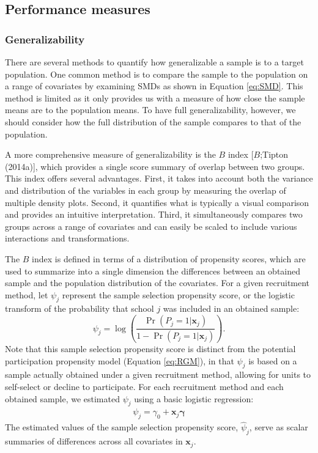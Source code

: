 \documentclass[
  english,
  man,floatsintext]{apa6}
\begin{document}
\hypertarget{performance-measures}{%
\subsection{Performance measures}\label{performance-measures}}

\hypertarget{generalizability}{%
\subsubsection{Generalizability}\label{generalizability}}

There are several methods to quantify how generalizable a sample is to a target population. One common method is to compare the sample to the population on a range of covariates by examining SMDs as shown in Equation \eqref{eq:SMD}. This method is limited as it only provides us with a measure of how close the sample means are to the population means.
To have full generalizability, however, we should consider how the full distribution of the sample compares to that of the population.

A more comprehensive measure of generalizability is the \(B\) index {[}\(B\);Tipton (2014a){]}, which provides a single score summary of overlap between two groups. This index offers several advantages. First, it takes into account both the variance and distribution of the variables in each group by measuring the overlap of multiple density plots. Second, it quantifies what is typically a visual comparison and provides an intuitive interpretation. Third, it simultaneously compares two groups across a range of covariates and can easily be scaled to include various interactions and transformations.

The \(B\) index is defined in terms of a distribution of propensity scores, which are used to summarize into a single dimension the differences between an obtained sample and the population distribution of the covariates.
For a given recruitment method, let \(\psi_j\) represent the sample selection propensity score, or the logistic transform of the probability that school \(j\) was included in an obtained sample:
\[
\psi_j = \log\left(\frac{\Pr(P_j = 1 | \mathbf{x}_j)}{1 - \Pr(P_j = 1 | \mathbf{x}_j)}\right). 
\]
Note that this sample selection propensity score is distinct from the potential participation propensity model (Equation \eqref{eq:RGM}), in that \(\psi_j\) is based on a sample actually obtained under a given recruitment method, allowing for units to self-select or decline to participate. For each recruitment method and each obtained sample, we estimated \(\psi_j\) using a basic logistic regression:
\begin{align}
\label{eq:PSA}
\psi_j = \gamma_0 + \mathbf{x}_j \boldsymbol\gamma
\end{align}
The estimated values of the sample selection propensity score, \(\hat\psi_j\), serve as scalar summaries of differences across all covariates in \(\mathbf{x}_j\).
\end{document}
